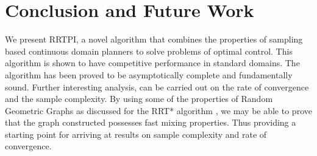 \documentclass[wcp]{jmlr}
\begin{document}
\section{Conclusion and Future Work}
We present RRTPI, a novel algorithm that combines the properties of sampling based continuous domain planners to solve problems of optimal control. This algorithm is shown to have competitive performance in standard domains.  The algorithm has been proved to be asymptotically complete and fundamentally sound.  Further interesting analysis, can be carried out on the rate of convergence and the sample complexity. By using some of the properties of Random Geometric Graphs as discussed for the RRT* algorithm \citep{karaman}, we may be able to prove that the graph constructed possesses fast mixing properties. Thus providing a starting point for arriving at results on sample complexity and rate of convergence. 


\end{document}
